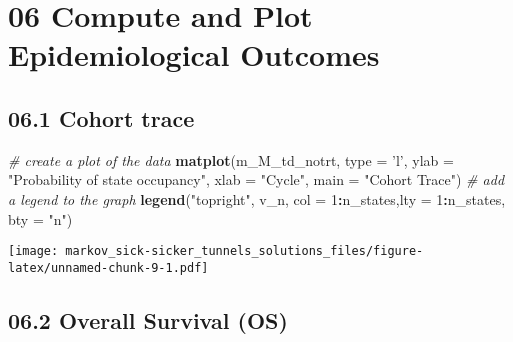 \documentclass[
]{article}
\newenvironment{Shaded}{\begin{snugshade}}{\end{snugshade}}
\newcommand{\CommentTok}[1]{\textcolor[rgb]{0.56,0.35,0.01}{\textit{#1}}}
\newcommand{\DataTypeTok}[1]{\textcolor[rgb]{0.13,0.29,0.53}{#1}}
\newcommand{\DecValTok}[1]{\textcolor[rgb]{0.00,0.00,0.81}{#1}}
\newcommand{\KeywordTok}[1]{\textcolor[rgb]{0.13,0.29,0.53}{\textbf{#1}}}
\newcommand{\NormalTok}[1]{#1}
\newcommand{\OperatorTok}[1]{\textcolor[rgb]{0.81,0.36,0.00}{\textbf{#1}}}
\newcommand{\StringTok}[1]{\textcolor[rgb]{0.31,0.60,0.02}{#1}}
\begin{document}
\hypertarget{compute-and-plot-epidemiological-outcomes}{%
\section{06 Compute and Plot Epidemiological
Outcomes}\label{compute-and-plot-epidemiological-outcomes}}

\hypertarget{cohort-trace-1}{%
\subsection{06.1 Cohort trace}\label{cohort-trace-1}}

\begin{Shaded}
\begin{Highlighting}[]
\CommentTok{# create a plot of the data}
\KeywordTok{matplot}\NormalTok{(m_M_td_notrt, }\DataTypeTok{type =} \StringTok{'l'}\NormalTok{, }
        \DataTypeTok{ylab =} \StringTok{"Probability of state occupancy"}\NormalTok{,}
        \DataTypeTok{xlab =} \StringTok{"Cycle"}\NormalTok{,}
        \DataTypeTok{main =} \StringTok{"Cohort Trace"}\NormalTok{)                 }
\CommentTok{# add a legend to the graph}
\KeywordTok{legend}\NormalTok{(}\StringTok{"topright"}\NormalTok{, v_n, }\DataTypeTok{col =} \DecValTok{1}\OperatorTok{:}\NormalTok{n_states,}\DataTypeTok{lty =} \DecValTok{1}\OperatorTok{:}\NormalTok{n_states, }\DataTypeTok{bty =} \StringTok{"n"}\NormalTok{) }
\end{Highlighting}
\end{Shaded}

\texttt{[image: markov\_sick-sicker\_tunnels\_solutions\_files/figure-latex/unnamed-chunk-9-1.pdf]}

\hypertarget{overall-survival-os}{%
\subsection{06.2 Overall Survival (OS)}\label{overall-survival-os}}
\end{document}
